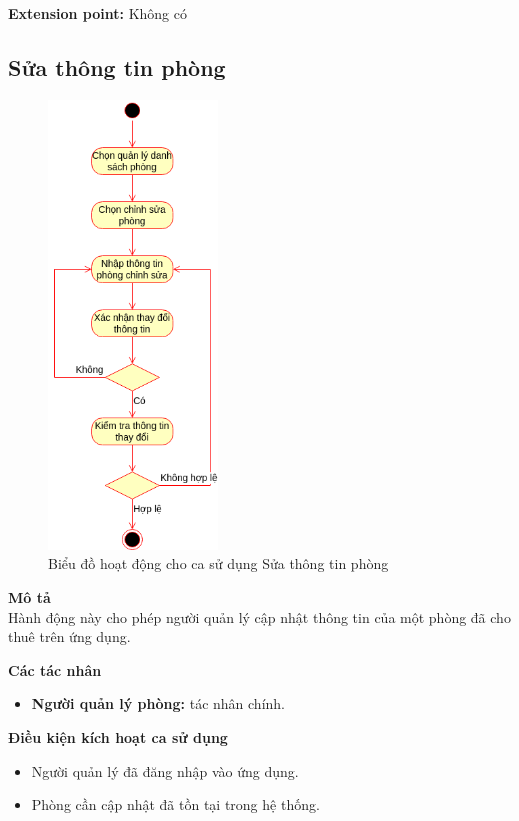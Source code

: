 \textbf{Extension point:} Không có



\subsection{Sửa thông tin phòng}
\begin{figure}[H]
    \centering
    \includegraphics[width=0.4\textwidth]{img/1.Việt-Sửa thông tin phòng.drawio.png}
    \caption{Biểu đồ hoạt động cho ca sử dụng Sửa thông tin phòng}
\end{figure}
\textbf{\indent Mô tả}\\
\indent Hành động này cho phép người quản lý cập nhật thông tin của một phòng đã cho thuê trên ứng dụng.

\textbf{Các tác nhân}
\begin{itemize}
    \item \textbf{Người quản lý phòng:} tác nhân chính.
\end{itemize}
\textbf{Điều kiện kích hoạt ca sử dụng}
\begin{itemize}
    \item Người quản lý đã đăng nhập vào ứng dụng.
    \item Phòng cần cập nhật đã tồn tại trong hệ thống.
\end{itemize}


